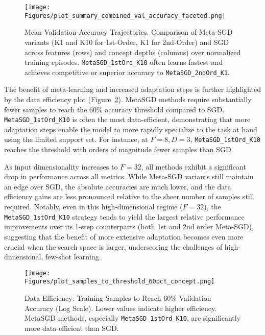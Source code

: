 \documentclass{article}
\begin{document}
\begin{figure}[htbp!]
    \centering
    \texttt{[image: Figures/plot\_summary\_combined\_val\_accuracy\_faceted.png]} %
    \caption{Mean Validation Accuracy Trajectories. Comparison of Meta-SGD variants (K1 and K10 for 1st-Order, K1 for 2nd-Order) and SGD across features (rows) and concept depths (columns) over normalized training episodes. \texttt{MetaSGD\_1stOrd\_K10} often learns fastest and achieves competitive or superior accuracy to \texttt{MetaSGD\_2ndOrd\_K1}.}
    \label{fig:accuracy_trajectories}
\end{figure}

The benefit of meta-learning and increased adaptation steps is further highlighted by the data efficiency plot (Figure~\ref{fig:data_efficiency_samples_to_threshold}). MetaSGD methods require substantially fewer samples to reach the 60\% accuracy threshold compared to SGD. \texttt{MetaSGD\_1stOrd\_K10} is often the most data-efficient, demonstrating that more adaptation steps enable the model to more rapidly specialize to the task at hand using the limited support set. For instance, at $F=8, D=3$, \texttt{MetaSGD\_1stOrd\_K10} reaches the threshold with orders of magnitude fewer samples than SGD.

As input dimensionality increases to $F=32$, all methods exhibit a significant drop in performance across all metrics. While Meta-SGD variants still maintain an edge over SGD, the absolute accuracies are much lower, and the data efficiency gains are less pronounced relative to the sheer number of samples still required. Notably, even in this high-dimensional regime ($F=32$), the \texttt{MetaSGD\_1stOrd\_K10} strategy tends to yield the largest relative performance improvements over its 1-step counterparts (both 1st and 2nd order Meta-SGD), suggesting that the benefit of more extensive adaptation becomes even more crucial when the search space is larger, underscoring the challenges of high-dimensional, few-shot learning.

\begin{figure}[htbp!]
    \centering
    \texttt{[image: Figures/plot\_samples\_to\_threshold\_60pct\_concept.png]} %
    \caption{Data Efficiency: Training Samples to Reach 60\% Validation Accuracy (Log Scale). Lower values indicate higher efficiency. MetaSGD methods, especially \texttt{MetaSGD\_1stOrd\_K10}, are significantly more data-efficient than SGD.}
    \label{fig:data_efficiency_samples_to_threshold}
\end{figure}
\end{document}
